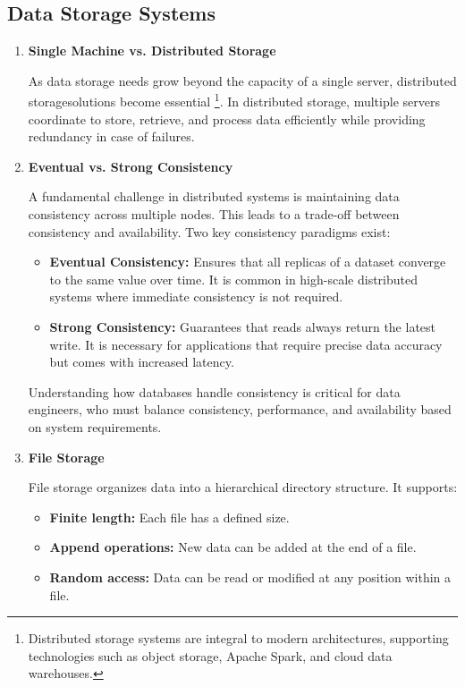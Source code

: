 \subsection{Data Storage Systems}

\begin{enumerate}
    \item \textbf{Single Machine vs. Distributed Storage}

    \noindent
    As data storage needs grow beyond the capacity of a single server,
    distributed storagesolutions become essential
    \footnote{
        Distributed storage systems are integral to modern architectures,
        supporting technologies such as object storage, Apache Spark,
        and cloud data warehouses.
    }.
    In distributed
    storage, multiple servers coordinate to store, retrieve, and
    process data efficiently while providing redundancy in case of
    failures.
    

    \item \textbf{Eventual vs. Strong Consistency}

    \noindent
    A fundamental challenge in distributed systems is maintaining data
    consistency across multiple nodes. This leads to a trade-off between
    consistency and availability. Two key consistency paradigms exist:
    \begin{itemize}
        \item \textbf{Eventual Consistency:} Ensures that all replicas
        of a dataset converge to the same value over time. It is common
        in high-scale distributed systems where immediate consistency is
        not required.

        \item \textbf{Strong Consistency:} Guarantees that reads always
        return the latest write. It is necessary for applications that
        require precise data accuracy but comes with increased latency.
    \end{itemize}
    Understanding how databases handle consistency is critical for data
    engineers, who must balance consistency, performance, and availability
    based on system requirements.


    \item \textbf{File Storage}

    \noindent
    File storage organizes data into a hierarchical directory structure.
    It supports:
    \begin{itemize}
        \item \textbf{Finite length:} Each file has a defined size.
        \item \textbf{Append operations:} New data can be added at the end
        of a file.
        \item \textbf{Random access:} Data can be read or modified at any
        position within a file.
    \end{itemize}



\end{enumerate}
